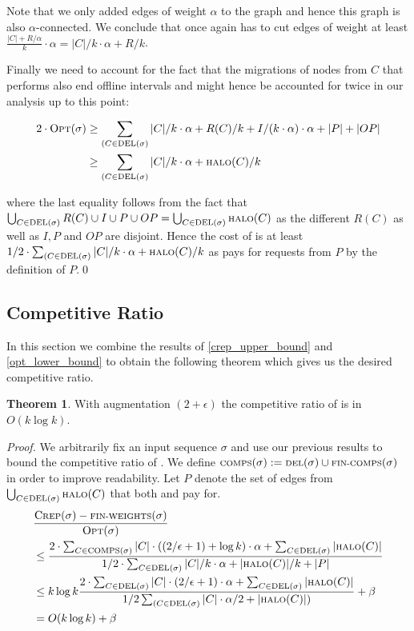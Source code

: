 \documentclass[a4paper,xcolor=dvipsnames, tikz, 12pt]{article}
\newcommand{\crep}{\text{C{\scriptsize REP}}}
\newcommand{\del}{\text{\scriptsize DEL}}
\newcommand{\opt}{\text{O{\scriptsize PT}}}
\newcommand{\halo}{\text{\scriptsize HALO}}
\newcommand{\finalComps}{\text{\scriptsize FIN-COMPS}}
\newcommand{\finalWeights}{\text{\scriptsize FIN-WEIGHTS}}
\newcommand{\comps}{\text{\scriptsize COMPS}}
\theoremstyle{definition}
\newtheorem{theo}[defi]{Theorem}
\begin{document}
Note that we only added edges of weight $\alpha$ to the graph and hence this graph is also $\alpha$-connected. We conclude that once again \opt{} has to cut edges of weight at least $\frac{|C|+R/\alpha}{k}\cdot\alpha=|C|/k\cdot\alpha+R/k$.

Finally we need to account for the fact that the migrations of nodes from $C$ that \opt{} performs also end offline intervals and might hence be accounted for twice in our analysis up to this point:

\begingroup
	\addtolength{\jot}{1em}

	\begin{align*}
		2\cdot\opt(\sigma)&\geq\sum_{(C\in\del{}(\sigma)}|C|/k\cdot\alpha+R(C)/k+I/(k\cdot\alpha)\cdot\alpha+|P|+|OP|\\
		&\geq\sum_{(C\in\del{}(\sigma)}|C|/k\cdot\alpha+\halo(C)/k
	\end{align*}
\endgroup

where the last equality follows from the fact that 
$\bigcup_{C\in\del(\sigma)}R(C)\cup I\cup P\cup OP=\bigcup_{C\in\del(\sigma)}\halo(C)$ as the different $R(C)$ as well as $I, P$ and $OP$ are disjoint.
Hence the cost of \opt{} is at least $1/2\cdot\sum_{(C\in\del{}(\sigma)}|C|/k\cdot\alpha+\halo(C)/k$ as \opt{} pays for requests from $P$ by the definition of $P$.\qed


\subsection{Competitive Ratio}
In this section we combine the results of \cref{crep_upper_bound} and \cref{opt_lower_bound} to obtain the following theorem which gives us the desired competitive ratio.

\begin{theo}
	\label{comp_ratio_theo}
	With augmentation $(2+\epsilon)$ the competitive ratio of \crep{} is in $O(k \log k)$.
\end{theo}

\textit{Proof.} We arbitrarily fix an input sequence $\sigma$ and use our previous results to bound the competitive ratio of \crep{}. We define $\comps(\sigma):=\del{}(\sigma)\cup\finalComps(\sigma)$ in order to improve readability. Let $P$ denote the set of edges from $\bigcup_{C\in\del{}(\sigma)}\halo{}(C)$ that both \crep{} and \opt{} pay for.
\begingroup
\addtolength{\jot}{1em}
\begin{align*}
&\frac{\crep{}(\sigma)-\finalWeights(\sigma)}{\opt(\sigma)}\\ 
&\leq\frac{2\cdot\sum_{C\in\comps(\sigma)}|C|\cdot((2/\epsilon+1)+\log k)\cdot\alpha +\sum_{C\in\del{}(\sigma)} |\halo(C)|}{1/2\cdot\sum_{C\in\del{}(\sigma)}|C|/k\cdot\alpha+|\halo(C)|/k +|P|}\\
&\leq k \log k\frac{2\cdot\sum_{C\in\del(\sigma)}|C|\cdot(2/\epsilon+1) \cdot\alpha+\sum_{C\in\del{}(\sigma)}|\halo(C)|}{1/2\sum_{(C\in\del{}(\sigma)}|C|\cdot\alpha/2+|\halo(C)|)}+\beta\\
& = O(k \log k) +\beta
\end{align*}
\endgroup
\end{document}
